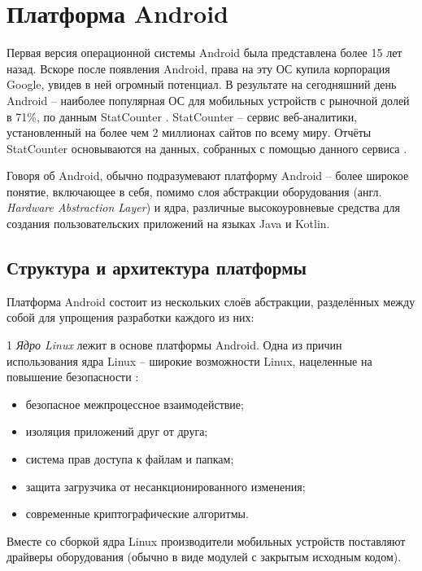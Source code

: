 
\section{Платформа Android}
\label{sec:android_platform}

Первая версия операционной системы Android была представлена более 15 лет назад.
Вскоре после появления Android, права на эту ОС купила корпорация Google, увидев в ней огромный потенциал.
В результате на сегодняшний день Android -- наиболее популярная ОС для мобильных устройств с рыночной долей в 71\%, по данным StatCounter \cite{statcounter_mobile_os}.
StatCounter -- сервис веб-аналитики, установленный на более чем 2 миллионах сайтов по всему миру.
Отчёты StatCounter основываются на данных, собранных с помощью данного сервиса \cite{statcounter_methodology}.

Говоря об Android, обычно подразумевают платформу Android -- более широкое понятие, включающее в себя, помимо слоя абстракции оборудования (англ. \textit{Hardware Abstraction Layer}) и ядра, различные высокоуровневые средства для создания пользовательских приложений на языках Java и Kotlin.

\subsection{Структура и архитектура платформы}
\label{sub:android_platform:struct_and_arch}

Платформа Android состоит из нескольких слоёв абстракции, разделённых между собой для упрощения разработки каждого из них: 

1 \textit{Ядро Linux} лежит в основе платформы Android.
Одна из причин использования ядра Linux -- широкие возможности Linux, нацеленные на повышение безопасности \cite{android_kernel_security}:
\begin{itemize}
	\item безопасное межпроцессное взаимодействие;
	\item изоляция приложений друг от друга;
	\item система прав доступа к файлам и папкам;
	\item защита загрузчика от несанкционированного изменения;
	\item современные криптографические алгоритмы.
\end{itemize}
Вместе со сборкой ядра Linux производители мобильных устройств поставляют драйверы оборудования (обычно в виде модулей с закрытым исходным кодом).

